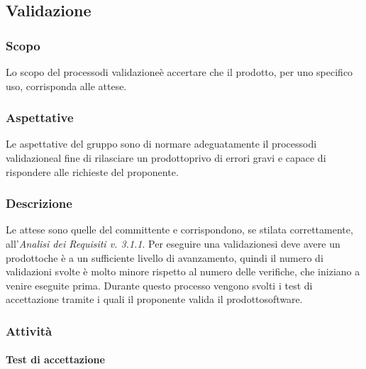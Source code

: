 \subsection{Validazione}

\subsubsection{Scopo}
Lo scopo del processo\glosp di validazione\glosp è accertare che il prodotto\glo, per uno specifico uso, corrisponda alle attese.

\subsubsection{Aspettative}
Le aspettative del gruppo sono di normare adeguatamente il processo\glosp di validazione\glosp al fine di rilasciare un prodotto\glosp privo di errori gravi e capace di rispondere alle richieste del proponente.

\subsubsection{Descrizione}
Le attese sono quelle del committente e corrispondono, se stilata correttamente, all'\textit{Analisi dei Requisiti v. 3.1.1}. 
Per eseguire una validazione\glosp si deve avere un prodotto\glosp che è a un sufficiente livello di avanzamento, quindi il numero di validazioni svolte è molto minore rispetto al numero delle verifiche, che iniziano a venire eseguite prima.
Durante questo processo vengono svolti i test di accettazione tramite i quali il proponente valida il prodotto\glosp software.

\subsubsection{Attività}
	\paragraph{Test di accettazione}
